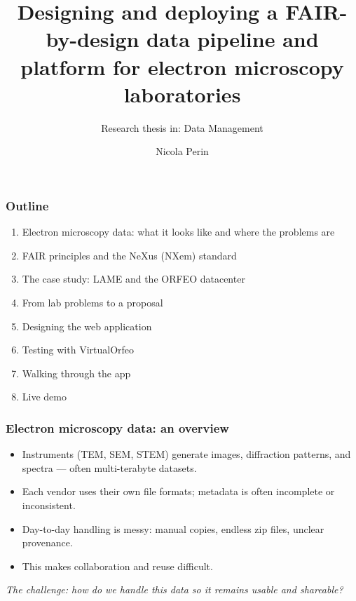 \documentclass{beamer}
\title[FAIR-by-design EM pipeline]{Designing and deploying a FAIR-by-design data pipeline and platform for electron microscopy laboratories}
\subtitle{Research thesis in: Data Management}
\institute{University of Trieste}
\author[Nicola Perin]{Nicola Perin}
\begin{document}
	
	
	\begin{frame}
		\setTitlestyleDissertation
		\maketitle
	\end{frame}
	
	\begin{frame}
		\frametitle{Outline}
		\begin{enumerate}
			\item Electron microscopy data: what it looks like and where the problems are
			\item FAIR principles and the NeXus (NXem) standard
			\item The case study: LAME and the ORFEO datacenter
			\item From lab problems to a proposal
			\item Designing the web application
			\item Testing with VirtualOrfeo
			\item Walking through the app
			\item Live demo
		\end{enumerate}
	\end{frame}
	
	
	
	\begin{frame}
		\frametitle{Electron microscopy data: an overview}
		
		\begin{itemize}
			\item Instruments (TEM, SEM, STEM) generate images, diffraction patterns, and spectra —
			often multi-terabyte datasets.
			\item Each vendor uses their own file formats; metadata is often incomplete or inconsistent.
			\item Day-to-day handling is messy: manual copies, endless zip files, unclear provenance.
			\item This makes collaboration and reuse difficult.
		\end{itemize}
		
		\vspace{0.5em}
		\small\textit{The challenge: how do we handle this data so it remains usable and shareable?}
	\end{frame}
	
\end{document}
